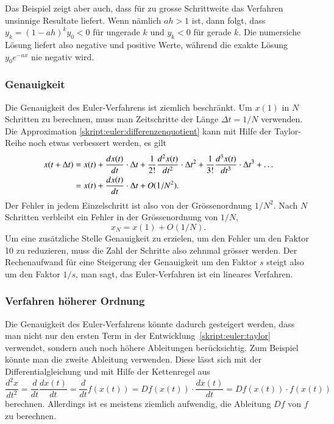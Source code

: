 Das Beispiel zeigt aber auch, dass für zu grosse Schrittweite das
Verfahren unsinnige Resultate liefert.
Wenn nämlich $ah>1$ ist, dann folgt, dass
$y_k=(1-ah)^k y_0  <0$ für ungerade $k$ und $y_k < 0$ für gerade $k$.
Die numersiche Lösung liefert also negative und positive Werte,
während die exakte Lösung $y_0e^{-ax}$ nie negativ wird.

\subsubsection{Genauigkeit}
Die Genauigkeit des Euler-Verfahrens ist ziemlich beschränkt.
%
Um $x(1)$ in $N$ Schritten zu berechnen, muss man Zeitschritte der
Länge $\Delta t=1/N$ verwenden.
Die Approximation \eqref{skript:euler:differenzenquotient} kann mit
Hilfe der Taylor-Reihe noch etwas verbessert werden, es gilt
\begin{align}
x(t+\Delta t)
&=
x(t) + \frac{d x(t) }{dt}\cdot \Delta t
+ \frac{1}{2!}\frac{d^2x(t)}{dt^2}\cdot \Delta t^2
+ \frac{1}{3!}\frac{d^3x(t)}{dt^3}\cdot \Delta t^3
+\dots
\label{skript:euler:taylor}
\\
&=
x(t) + \frac{d x(t) }{dt}\cdot \Delta t
+ O(1/N^2).
\notag
\end{align}
Der Fehler in jedem Einzelschritt ist also von der Grössenordnung $1/N^2$.
Nach $N$ Schritten verbleibt ein Fehler in der Grössenordnung von $1/N$,
\[
x_N = x(1) + O(1/N).
\]
Um eine zusätzliche Stelle Genauigkeit zu erzielen, um den Fehler um
den Faktor 10 zu reduzieren, muss die Zahl der Schritte also zehnmal 
grösser werden.
Der Rechenaufwand für eine Steigerung der Genauigkeit um den Faktor
$s$ steigt also um den Faktor $1/s$, man sagt, das Euler-Verfahren ist
ein lineares Verfahren.

\subsubsection{Verfahren höherer Ordnung}
Die Genauigkeit des Euler-Verfahrens könnte dadurch gesteigert
werden, dass man nicht nur den ersten Term in der
Entwicklung~\eqref{skript:euler:taylor} verwendet, sondern auch
noch höhere Ableitungen berücksichtig.
Zum Beispiel könnte man die zweite Ableitung verwenden.
Diese lässt sich mit der Differentialgleichung und mit Hilfe der Kettenregel
aus
\[
\frac{d^2x}{dt^2}
=
\frac{d}{dt} \frac{dx(t)}{dt}
=
\frac{d}{dt} f(x(t))
=
Df(x(t))\cdot \frac{dx(t)}{dt}
=
Df(x(t))\cdot f(x(t))
\]
berechnen.
Allerdings ist es meistens ziemlich aufwendig, die Ableitung $Df$ von $f$ zu
berechnen.

